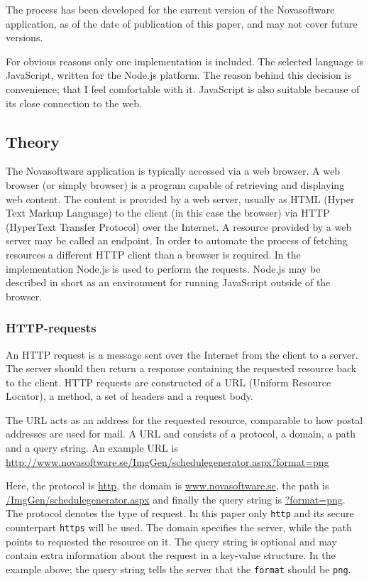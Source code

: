 \documentclass{article}
\begin{document}
	The process has been developed for the current version of the Novasoftware application, as of the date of publication of this paper, and may not cover future versions.
	
	For obvious reasons only one implementation is included. The selected language is JavaScript, written for the Node.js platform. The reason behind this decision is convenience; that I feel comfortable with it. JavaScript is also suitable because of its close connection to the web.
	
	\subsection{Theory}
	
	The Novasoftware application is typically accessed via a web browser. A web browser (or simply browser) is a program capable of retrieving and displaying web content. The content is provided by a web server, usually as HTML (Hyper Text Markup Language) to the client (in this case the browser) via HTTP (HyperText Transfer Protocol) over the Internet.\cite{wikipedia web browser} A resource provided by a web server may be called an endpoint. In order to automate the process of fetching resources a different HTTP client than a browser is required. In the implementation Node.js is used to perform the requests. Node.js may be described in short as an environment for running JavaScript outside of the browser.\cite{wikipedia node.js}
	
	\subsubsection{HTTP-requests}
	An HTTP request is a message sent over the Internet from the client to a server. The server should then return a response containing the requested resource back to the client. HTTP requests are constructed of a URL (Uniform Resource Locator), a method, a set of headers and a request body.
	
	The URL acts as an address for the requested resource, comparable to how postal addresses are used for mail. A URL and consists of a protocol, a domain, a path and a query string. An example URL is\\
	\url{http://www.novasoftware.se/ImgGen/schedulegenerator.aspx?format=png}
	
	Here, the protocol is \url{http}, the domain is \url{www.novasoftware.se}, the path is \url{/ImgGen/schedulegenerator.aspx} and finally the query string is \url{?format=png}.
	The protocol denotes the type of request. In this paper only \texttt{http} and its secure counterpart \texttt{https} will be used. The domain specifies the server, while the path points to requested the resource on it. The query string is optional and may contain extra information about the request in a key-value structure. In the example above; the query string tells the server that the \texttt{format} should be \texttt{png}.
	
\end{document}

